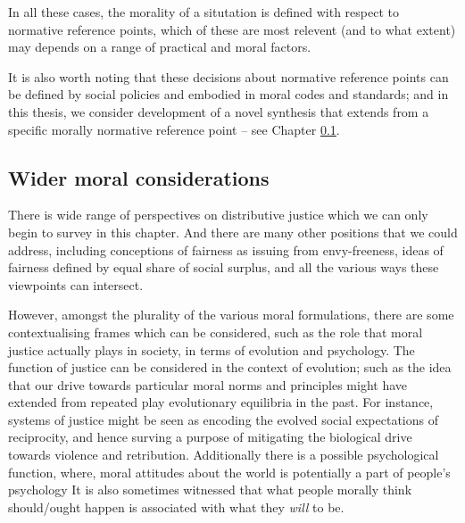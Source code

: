 
In all these cases, the morality of a situtation is defined with respect to normative reference points, which of these are most relevent (and to what extent) may depends on a range of practical and moral factors.

It is also worth noting that these decisions about normative reference points can be defined by social policies %
 and embodied in moral codes and standards; and in this thesis, we consider development of a novel synthesis that extends from a specific morally normative reference point -- see Chapter \ref{}. 


\subsection{Wider moral considerations}

There is wide range of perspectives on distributive justice which we can only begin to survey in this chapter.
And there are many other positions that we could address, including conceptions of fairness as issuing from envy-freeness, ideas of fairness defined by equal share of social surplus, and all the various ways these viewpoints can intersect.%

However, amongst the plurality of the various moral formulations, there are some contextualising frames which can be considered, such as the role that moral justice actually plays in society, in terms of evolution and psychology.
The function of justice can be considered in the context of evolution; such as the idea that our drive towards particular moral norms and principles might have extended from repeated play evolutionary equilibria in the past. \cite{Binmore10785}
For instance, systems of justice might be seen as encoding the evolved social expectations of reciprocity, and hence surving a purpose of mitigating the biological drive towards violence and retribution.\cite{doi:10.1300/J135v02n04}
Additionally there is a possible psychological function, where, moral attitudes about the world is potentially a part of people's psychology \cite{doi:10.1037/1089-2680.6.1.25, doi:10.1080/00981389.2019.1640337}
It is also sometimes witnessed that what people morally think should/ought happen is associated with what they \textit{will} to be.\cite{doi:10.1080/13869795.2016.1212395, sep-moral-motivation, LITZ2009695}

